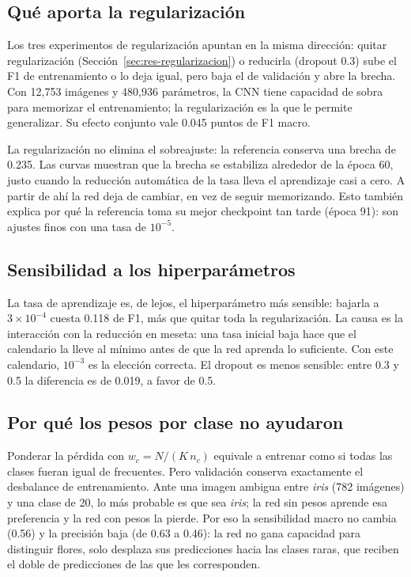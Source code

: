 \subsection{Qué aporta la regularización}

Los tres experimentos de regularización apuntan en la misma dirección: quitar
regularización (Sección~\ref{sec:res-regularizacion}) o reducirla (dropout 0.3)
sube el F1 de entrenamiento o lo deja igual, pero baja el de validación y abre
la brecha. Con 12,753 imágenes y 480,936 parámetros, la CNN tiene capacidad de
sobra para memorizar el entrenamiento; la regularización es la que le permite
generalizar. Su efecto conjunto vale 0.045 puntos de F1 macro.

La regularización no elimina el sobreajuste: la referencia conserva una brecha
de 0.235. Las curvas muestran que la brecha se estabiliza alrededor de la época
60, justo cuando la reducción automática de la tasa lleva el aprendizaje casi a
cero. A partir de ahí la red deja de cambiar, en vez de seguir memorizando. Esto
también explica por qué la referencia toma su mejor checkpoint tan tarde (época
91): son ajustes finos con una tasa de $10^{-5}$.

\subsection{Sensibilidad a los hiperparámetros}

La tasa de aprendizaje es, de lejos, el hiperparámetro más sensible: bajarla a
$3\times10^{-4}$ cuesta 0.118 de F1, más que quitar toda la regularización. La
causa es la interacción con la reducción en meseta: una tasa inicial baja hace
que el calendario la lleve al mínimo antes de que la red aprenda lo suficiente.
Con este calendario, $10^{-3}$ es la elección correcta. El dropout es menos
sensible: entre 0.3 y 0.5 la diferencia es de 0.019, a favor de 0.5.

\subsection{Por qué los pesos por clase no ayudaron}

Ponderar la pérdida con $w_c = N/(K\,n_c)$ equivale a entrenar como si todas las
clases fueran igual de frecuentes. Pero validación conserva exactamente el
desbalance de entrenamiento. Ante una imagen ambigua entre
\emph{iris} (782 imágenes) y una clase de 20, lo más probable es que sea
\emph{iris}; la red sin pesos aprende esa preferencia y la red con pesos la
pierde. Por eso la sensibilidad macro no cambia (0.56) y la precisión baja (de
0.63 a 0.46): la red no gana capacidad para distinguir flores, solo desplaza sus
predicciones hacia las clases raras, que reciben el doble de predicciones de las
que les corresponden.

